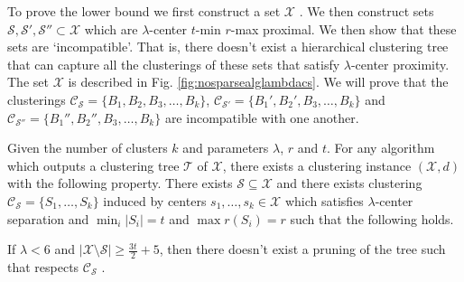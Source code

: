 \documentclass[anon,12pt]{colt2016} %
\newcommand{\mc}{\mathcal}
\begin{document}
To prove the lower bound we first construct a set $\mc X$ . We then construct sets $\mc S, \mc S', \mc S'' \subset \mc X$ which are $\lambda$-center $t$-min $r$-max proximal. We then show that these sets are `incompatible'. That is, there doesn't exist a  hierarchical clustering tree that can capture all the clusterings of these sets that satisfy $\lambda$-center proximity. The set $\mc X$ is described in Fig. \ref{fig:nosparsealglambdacs}. We will prove that the clusterings $\mc C_{\mc S} = \{B_1, B_2, B_3, \ldots, B_k\}$, $\mc C_{\mc S'} = \{B_1', B_2', B_3, \ldots, B_k\}$ and $\mc C_{\mc S''} = \{B_1'', B_2'', B_3, \ldots, B_k\}$ are incompatible with one another.

\begin{theorem}
Given the number of clusters $k$ and parameters $\lambda$, $r$ and $t$. For any algorithm which outputs a clustering tree $\mc T$ of $\mc X$, there exists a clustering instance $(\mc X, d)$ with the following property. There exists $\mc S \subseteq \mc X$ and there exists clustering $\mc C_{\mc S} = \{S_1, \ldots, S_k\}$ induced by centers $s_1, \ldots, s_k \in \mc X$ which satisfies $\lambda$-center separation and $\min_i |S_i| = t$ and $\max r(S_i) = r$ such that the following holds.

If $\lambda < 6$ and $|\mc X\setminus \mc S|\ge \frac{3t}{2}+5$, then there doesn't exist a pruning of the tree such that respects $\mc C_{\mc S}$ .
\end{theorem}
\end{document}
